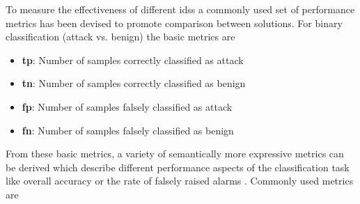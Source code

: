 To measure the effectiveness of different \glspl{ids} a commonly used set of performance metrics has been devised to promote comparison between solutions. For binary classification (attack vs. benign) the basic metrics are

\begin{itemize}
	\item \textbf{\gls{tp}}: Number of samples correctly classified as attack
	\item \textbf{\gls{tn}}: Number of samples correctly classified as benign
	\item \textbf{\gls{fp}}: Number of samples falsely classified as attack
	\item \textbf{\gls{fn}}: Number of samples falsely classified as benign
\end{itemize}

From these basic metrics, a variety of semantically more expressive metrics can be derived which describe different performance aspects of the classification task like overall accuracy or the rate of falsely raised alarms \cite{confusion_matrix}. Commonly used metrics are 

